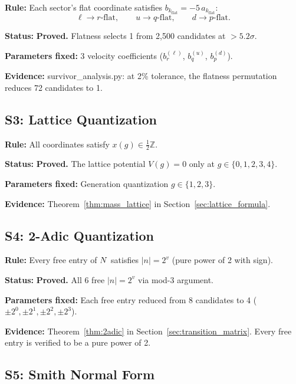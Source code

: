 \textbf{Rule:} Each sector's flat coordinate satisfies $b_{k_{\mathrm{flat}}} = -5\,a_{k_{\mathrm{flat}}}$:
\begin{equation}
\ell \to r\text{-flat}, \qquad u \to q\text{-flat}, \qquad d \to p\text{-flat}.
\end{equation}

\textbf{Status:} \textbf{Proved.} Flatness selects 1 from 2,500 candidates at $> 5.2\sigma$.

\textbf{Parameters fixed:} 3 velocity coefficients ($b_r^{(\ell)}$, $b_q^{(u)}$, $b_p^{(d)}$).

\textbf{Evidence:} survivor\_analysis.py: at 2\% tolerance, the flatness permutation reduces 72 candidates to 1.

\subsection{S3: Lattice Quantization}\label{app:s3}

\textbf{Rule:} All coordinates satisfy $x(g) \in \frac{1}{2}\mathbb{Z}$.

\textbf{Status:} \textbf{Proved.} The lattice potential $V(g) = 0$ only at $g \in \{0, 1, 2, 3, 4\}$.

\textbf{Parameters fixed:} Generation quantization $g \in \{1, 2, 3\}$.

\textbf{Evidence:} Theorem~\ref{thm:mass_lattice} in Section~\ref{sec:lattice_formula}.

\subsection{S4: 2-Adic Quantization}\label{app:s4}

\textbf{Rule:} Every free entry of $N$ satisfies $|n| = 2^v$ (pure power of 2 with sign).

\textbf{Status:} \textbf{Proved.} All 6 free $|n| = 2^v$ via mod-3 argument.

\textbf{Parameters fixed:} Each free entry reduced from 8 candidates to 4 ($\pm 2^0, \pm 2^1, \pm 2^2, \pm 2^3$).

\textbf{Evidence:} Theorem~\ref{thm:2adic} in Section~\ref{sec:transition_matrix}. Every free entry is verified to be a pure power of 2.

\subsection{S5: Smith Normal Form}\label{app:s5}

